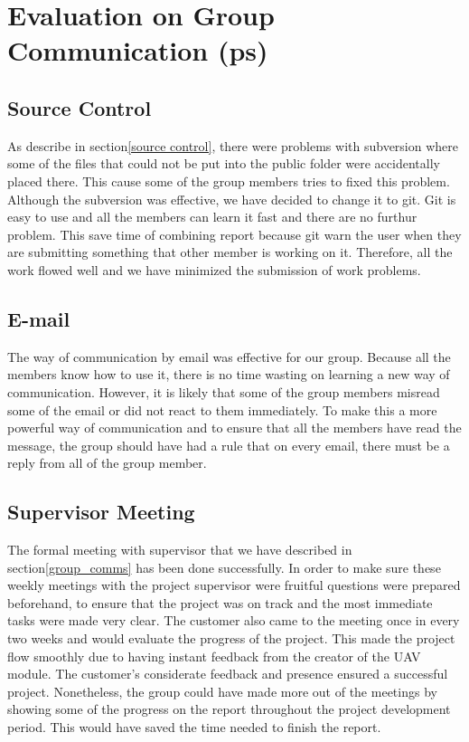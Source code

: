 
\section{Evaluation on Group Communication (ps)}
\label{evaluation on group communication}

\subsection{Source Control}
As describe in section\ref{source control}, there were problems with subversion where some of the files that could not be put into the public folder were accidentally placed there.
This cause some of the group members tries to fixed this problem.
Although the subversion was effective, we have decided to change it to git.
Git is easy to use and all the members can learn it fast and there are no furthur problem.
This save time of combining report because git warn the user when they are submitting something that other member is working on it.
Therefore, all the work flowed well and we have minimized the submission of work problems.


\subsection{E-mail}
The way of communication by email was effective for our group.
Because all the members know how to use it, there is no time wasting on learning a new way of communication.
However, it is likely that some of the group members misread some of the email or did not react to them immediately.
To make this a more powerful way of communication and to ensure that all the members have read the message, the group should have had a rule that on every email, there must be a reply from all of the group member.

\subsection{Supervisor Meeting}
The formal meeting with supervisor that we have described in section\ref{group_comms} has been done successfully. 
In order to make sure these weekly meetings with the project supervisor were fruitful questions were prepared beforehand, to ensure that the project was on track and the most immediate tasks were made very clear.
The customer also came to the meeting once in every two weeks and would evaluate the progress of the project.
This made the project flow smoothly due to having instant feedback from the creator of the UAV module.
The customer's considerate feedback and presence ensured a successful project.
Nonetheless, the group could have made more out of the meetings by showing some of the progress on the report  throughout the project development period.
This would have saved the time needed to finish the report.



